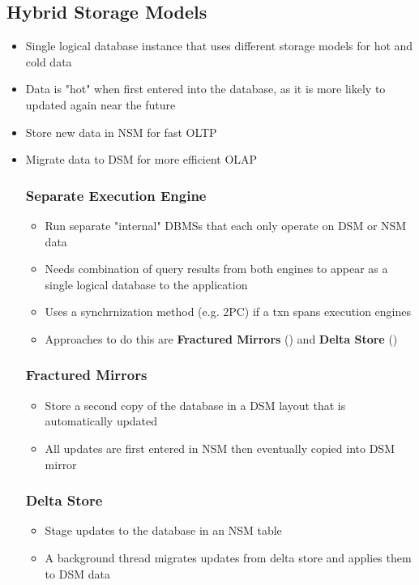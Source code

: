\documentclass[11pt]{article}
\begin{document}
    \subsection*{Hybrid Storage Models}
    \begin{itemize}
        \item Single logical database instance that uses different storage models for hot and cold data
        \item Data is "hot" when first entered into the database, as it is more likely to updated again near the future
        \item Store new data in NSM for fast OLTP
        \item Migrate data to DSM for more efficient OLAP

        \subsubsection*{Separate Execution Engine}
        \begin{itemize}
            \item Run separate "internal" DBMSs that each only operate on DSM or NSM data
            \item Needs combination of query results from both engines to appear as a single logical database to the application
            \item Uses a synchrnization method (e.g. 2PC) if a txn spans execution engines
            \item Approaches to do this are \textbf{Fractured Mirrors} () and \textbf{Delta Store} ()
        \end{itemize}

        \subsubsection*{Fractured Mirrors~\cite{p430-ramamurthy}}
        \begin{itemize}
            \item Store a second copy of the database in a DSM layout that is automatically updated
            \item All updates are first entered in NSM then eventually copied into DSM mirror
        \end{itemize}
        \subsubsection*{Delta Store}
        \begin{itemize}
            \item Stage updates to the database in an NSM table
            \item A background thread migrates updates from delta store and applies them to DSM data
        \end{itemize}


\end{itemize}
\end{document}
